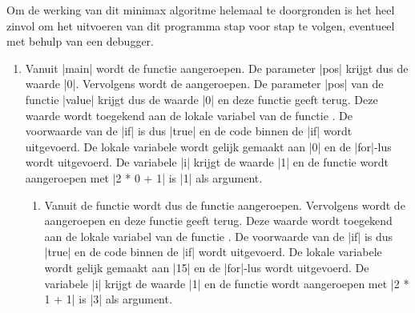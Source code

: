 \begin{cpplstShortInline}
Om de werking van dit minimax algoritme helemaal te doorgronden is het heel zinvol om het uitvoeren van dit programma stap voor stap te volgen, eventueel met behulp van een debugger.
\begin{enumerate}[leftmargin=1.4em]
	\item Vanuit |main| wordt de functie  aangeroepen.
	De parameter |pos| krijgt dus de waarde |0|.
	Vervolgens wordt de  aangeroepen.
	De parameter |pos| van de functie |value| krijgt dus de waarde |0| en deze functie geeft  terug.
	Deze waarde wordt toegekend aan de lokale variabel  van de functie .
	De voorwaarde van de |if| is dus |true| en de code binnen de |if| wordt uitgevoerd.
	De lokale variabele  wordt gelijk gemaakt aan |0| en de |for|-lus wordt uitgevoerd.
	De variabele |i| krijgt de waarde |1| en de functie  wordt aangeroepen met |2 * 0 + 1| is |1| als argument.
	\begin{enumerate}[label*=\arabic*.,leftmargin=1.4em]
		\item Vanuit de functie  wordt dus de functie  aangeroepen.
		Vervolgens wordt de  aangeroepen en deze functie geeft  terug.
		Deze waarde wordt toegekend aan de lokale variabel  van de functie .
		De voorwaarde van de |if| is dus |true| en de code binnen de |if| wordt uitgevoerd.
		De lokale variabele  wordt gelijk gemaakt aan |15| en de |for|-lus wordt uitgevoerd.
		De variabele |i| krijgt de waarde |1| en de functie  wordt aangeroepen met |2 * 1 + 1| is |3| als argument.

\end{enumerate}
\end{enumerate}
\end{cpplstShortInline}
